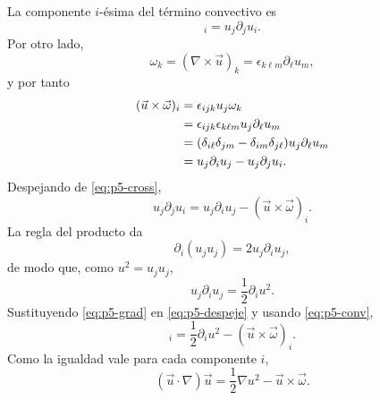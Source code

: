 \documentclass[12pt]{article}
\begin{document}
La componente $i$-ésima del término convectivo es
\begin{equation}
    [(\vec u\cdot\nabla)\vec u]_i=u_j\partial_j u_i.
    \label{eq:p5-conv}
\end{equation}
Por otro lado,
\begin{equation}
    \omega_k=(\nabla\times\vec u)_k=\epsilon_{k\ell m}\partial_\ell u_m,
\end{equation}
y por tanto
\begin{align}
(\vec u\times\vec\omega)_i
&=\epsilon_{ijk}u_j\omega_k \notag\\
&=\epsilon_{ijk}\epsilon_{k\ell m}u_j\partial_\ell u_m \notag\\
&=(\delta_{i\ell}\delta_{jm}-\delta_{im}\delta_{j\ell})u_j\partial_\ell u_m \notag\\
&=u_j\partial_i u_j-u_j\partial_j u_i. \label{eq:p5-cross}
\end{align}
Despejando de \eqref{eq:p5-cross},
\begin{equation}
    u_j\partial_j u_i
    =u_j\partial_i u_j-(\vec u\times\vec\omega)_i.
    \label{eq:p5-despeje}
\end{equation}
La regla del producto da
\begin{equation}
    \partial_i(u_ju_j)=2u_j\partial_i u_j,
\end{equation}
de modo que, como $u^2=u_ju_j$,
\begin{equation}
    u_j\partial_i u_j=\frac12\partial_i u^2.
    \label{eq:p5-grad}
\end{equation}
Sustituyendo \eqref{eq:p5-grad} en \eqref{eq:p5-despeje} y usando \eqref{eq:p5-conv},
\begin{equation}
    [(\vec u\cdot\nabla)\vec u]_i
    =\frac12\partial_i u^2-(\vec u\times\vec\omega)_i.
\end{equation}
Como la igualdad vale para cada componente $i$,
\begin{equation}
    \boxed{(\vec u\cdot\nabla)\vec u
    =\frac12\nabla u^2-\vec u\times\vec\omega}.
\end{equation}
\end{document}
